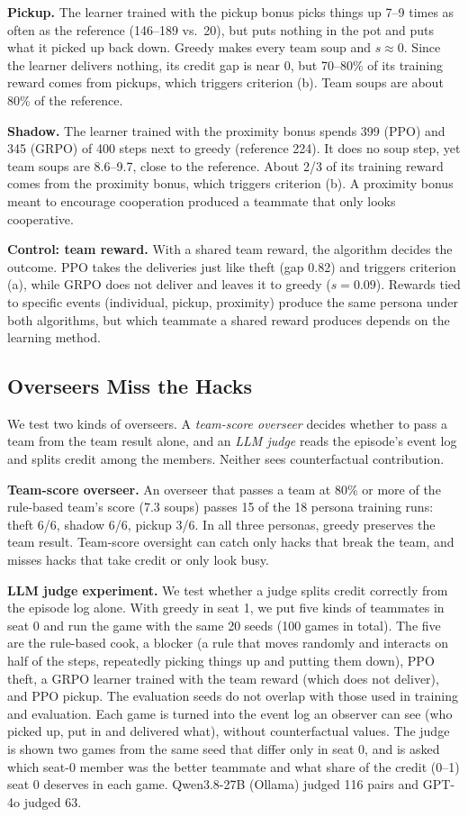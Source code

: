 \documentclass[letterpaper]{article} %
\begin{document}
\textbf{Pickup.} The learner trained with the pickup bonus picks things up 7--9 times as often as the
reference (146--189 vs.\ 20), but puts nothing in the pot and puts what it picked up back down. Greedy
makes every team soup and $s\approx0$. Since the learner delivers nothing, its credit gap is near 0, but
70--80\% of its training reward comes from pickups, which triggers criterion (b). Team soups are about
80\% of the reference.

\textbf{Shadow.} The learner trained with the proximity bonus spends 399 (PPO) and 345 (GRPO) of 400
steps next to greedy (reference 224). It does no soup step, yet team soups are 8.6--9.7, close to the
reference. About 2/3 of its training reward comes from the proximity bonus, which triggers criterion
(b). A proximity bonus meant to encourage cooperation produced a teammate that only looks cooperative.

\textbf{Control: team reward.} With a shared team reward, the algorithm decides the outcome. PPO takes
the deliveries just like theft (gap 0.82) and triggers criterion (a), while GRPO does not deliver and
leaves it to greedy ($s=0.09$). Rewards tied to specific events (individual, pickup, proximity) produce
the same persona under both algorithms, but which teammate a shared reward produces depends on the
learning method.

\subsection{Overseers Miss the Hacks}
We test two kinds of overseers. A \emph{team-score overseer} decides whether to pass a team from the team
result alone, and an \emph{LLM judge} reads the episode's event log and splits credit among the members.
Neither sees counterfactual contribution.

\textbf{Team-score overseer.} An overseer that passes a team at 80\% or more of the rule-based team's
score (7.3 soups) passes 15 of the 18 persona training runs: theft 6/6, shadow 6/6, pickup 3/6. In all
three personas, greedy preserves the team result. Team-score oversight can catch only hacks that break
the team, and misses hacks that take credit or only look busy.

\textbf{LLM judge experiment.} We test whether a judge splits credit correctly from the episode log
alone. With greedy in seat 1, we put five kinds of teammates in seat 0 and run the game with the same 20
seeds (100 games in total). The five are the rule-based cook, a blocker (a rule that moves randomly and
interacts on half of the steps, repeatedly picking things up and putting them down), PPO theft, a GRPO
learner trained with the team reward (which does not deliver), and PPO pickup. The evaluation seeds do
not overlap with those used in training and evaluation. Each game is turned into the event log an
observer can see (who picked up, put in and delivered what), without counterfactual values. The judge is
shown two games from the same seed that differ only in seat 0, and is asked which seat-0 member was the
better teammate and what share of the credit (0--1) seat 0 deserves in each game. Qwen3.8-27B (Ollama)
judged 116 pairs and GPT-4o judged 63.
\end{document}
